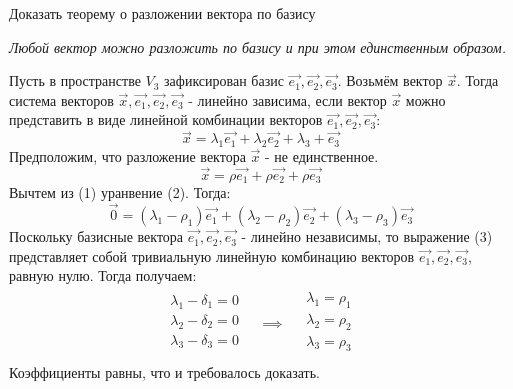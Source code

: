 \begin{question}
  Доказать теорему о разложении вектора по базису
\end{question}
\begin{answer}
  \begin{center}
    \textit{Любой вектор можно разложить по базису и при этом единственным образом.} 
  \end{center}  
  Пусть в пространстве $V_3$ зафиксирован базис $\vec{e_1}, \vec{e_2}, \vec{e_3}$. Возьмём вектор $\vec{x}$. Тогда система векторов $\vec{x}, \vec{e_1}, \vec{e_2}, \vec{e_3}$ - линейно зависима, если вектор $\vec{x}$ можно представить в виде линейной комбинации векторов $\vec{e_1}, \vec{e_2}, \vec{e_3}$: \[
  \vec{x} = \lambda_1 \vec{e_1} + \lambda_2 \vec{e_2} + \lambda_3 + \vec{e_3} \tag{1}
\]
  Предположим, что разложение вектора $\vec{x}$ - не единственное. \[
  \vec{x} = \rho \vec{e_1} + \rho \vec{e_2} + \rho \vec{e_3} \tag{2}
\]
  Вычтем из (1) уранвение (2). Тогда: \[
    \vec{0} = \left( \lambda_1 - \rho_1 \right) \vec{e_1} + \left( \lambda_2 - \rho_2 \right) \vec{e_2} + \left( \lambda_3 - \rho_3 \right) \vec{e_3} \tag{3}
\]
Поскольку базисные вектора $\vec{e_1}, \vec{e_2}, \vec{e_3}$ - линейно независимы, то выражение (3) представляет собой тривиальную линейную комбинацию векторов $\vec{e_1}, \vec{e_2}, \vec{e_3}$, равную нулю. Тогда получаем:
  \begin{gather*}
    \begin{matrix}  
      \lambda_1 - \delta_1 = 0 \\
      \lambda_2 - \delta_2 = 0 \\
      \lambda_3 - \delta_3 = 0 \\
    \end{matrix}
    \quad \implies \quad
    \begin{matrix}
      \lambda_1 = \rho_1 \\
      \lambda_2 = \rho_2 \\
      \lambda_3 = \rho_3 \\
    \end{matrix}
  \end{gather*}
  Коэффициенты равны, что и требовалось доказать.
\end{answer}

